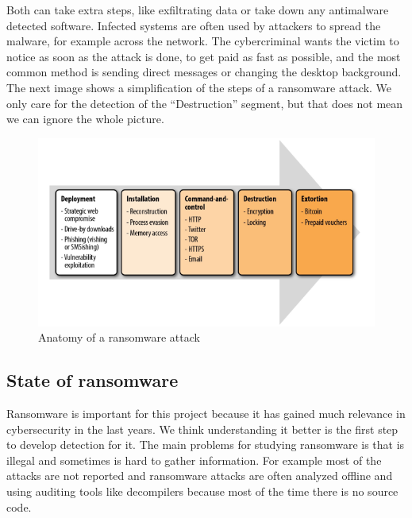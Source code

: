 \linej
Both can take extra steps, like exfiltrating data or take down any antimalware detected software.
Infected systems are often used by attackers to spread the malware, for example across the network.
The cybercriminal wants the victim to notice as soon as the attack is done, to get paid as fast as possible, and the most common method is sending direct messages or changing the desktop background.
\linej
\linej
The next image shows a simplification of the steps of a ransomware attack.
We only care for the detection of the ``Destruction'' segment, but that does not mean we can ignore the whole picture.
\begin{figure}[H]
	\centering
	\includegraphics[width=\textwidth]{figuras/anatomy_of_a_ransomware_attack.png}
	\caption{Anatomy of a ransomware attack\cite{ransomware_oReilly}}
\end{figure}

\subsection{State of ransomware}
Ransomware is important for this project because it has gained much relevance in cybersecurity in the last years.
We think understanding it better is the first step to develop detection for it.
\linej
\linej
The main problems for studying ransomware is that is illegal and sometimes is hard to gather information.
For example most of the attacks are not reported and ransomware attacks are often analyzed offline and using auditing tools like decompilers because most of the time there is no source code\cite{ransomware_digital_extortion}.

